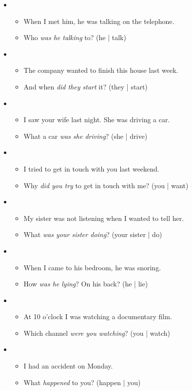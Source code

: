 \begin{itemize}

\item
\begin{itemize}
\item When I met him, he was talking on the telephone.
\item Who \textit{was he talking} to? (he | talk)
\end{itemize}

\item
\begin{itemize}
\item The company wanted to finish this house last week.
\item And when \textit{did they start} it? (they | start)
\end{itemize}

\item
\begin{itemize}
\item I saw your wife last night. She was driving a car. 
\item What a car \textit{was she driving}? (she | drive)
\end{itemize}

\item
\begin{itemize}
\item I tried to get in touch with you last weekend. 
\item Why \textit{did you try} to get in touch with me? (you | want)
\end{itemize}

\item
\begin{itemize}
\item My sister was not listening when I wanted to tell her.
\item What \textit{was your sister doing}? (your sister | do)
\end{itemize}

\item
\begin{itemize}
\item When I came to his bedroom, he was snoring.
\item How \textit{was he lying}? On his back? (he | lie)
\end{itemize}

\item
\begin{itemize}
\item At 10 o'clock I was watching a documentary film.
\item Which channel \textit{were you watching}? (you | watch)
\end{itemize}

\item
\begin{itemize}
\item I had an accident on Monday.
\item What \textit{happened} to you? (happen | you)
\end{itemize}

\end{itemize}

